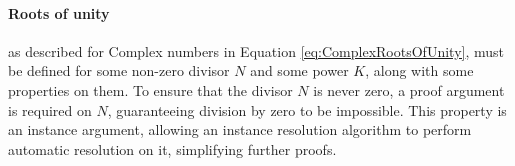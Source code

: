 \begin{AgdaMultiCode}
\paragraph{Roots of unity}\label{para:roots_of_unity} as described for Complex numbers in Equation 
\ref{eq:ComplexRootsOfUnity}, must be defined for some non-zero divisor $N$ 
and some power $K$, along with some properties on them.
To ensure that the divisor $N$ is never zero, a  proof argument is 
required on $N$, guaranteeing division by zero to be impossible.
This  property is an instance argument, allowing an instance 
resolution algorithm\cite{InstanceArgs}
to perform automatic resolution on it, simplifying further proofs.
\begin{code}%
%
\>[6]\AgdaSpace{}%
\AgdaSymbol{:}\AgdaSpace{}%
\AgdaSymbol{(}\AgdaSpace{}%
\AgdaSymbol{:}\AgdaSpace{}%
\AgdaSymbol{)}\AgdaSpace{}%
\AgdaSpace{}%
\AgdaSpace{}%
\AgdaSpace{}%
\AgdaSymbol{:}\AgdaSpace{}%
\AgdaSpace{}%
\AgdaSpace{}%
\AgdaSymbol{\}\}}\AgdaSpace{}%
\AgdaSpace{}%
\AgdaSymbol{(}\AgdaSpace{}%
\AgdaSymbol{:}\AgdaSpace{}%
\AgdaSymbol{)}\AgdaSpace{}%
\AgdaSpace{}%
\<%
\\
%
\>[6]%
\>[17]\AgdaSymbol{:}\AgdaSpace{}%
\AgdaSpace{}%
\AgdaSpace{}%
%
\>[43]\AgdaSpace{}%
\<%
\\
%
\>[6]%
\>[17]\AgdaSymbol{:}\AgdaSpace{}%
\AgdaSpace{}%
\AgdaSpace{}%
\AgdaSymbol{(}\AgdaSpace{}%
\AgdaSpace{}%
\AgdaSymbol{)}%
\>[43]\AgdaSpace{}%
\<%
\\
%
\>[6]%
\>[17]\AgdaSymbol{:}\AgdaSpace{}%
\AgdaSpace{}%
\AgdaSymbol{(}\AgdaSpace{}%
\AgdaSpace{}%
\AgdaSymbol{)}\AgdaSpace{}%
\AgdaSymbol{(}\AgdaSpace{}%
\AgdaSpace{}%
\AgdaSymbol{)}%
\>[43]\AgdaSpace{}%
\AgdaSpace{}%
\AgdaSpace{}%
\<%
\\
%
\>[6]%
\>[17]\AgdaSymbol{:}\AgdaSpace{}%
\AgdaSpace{}%
\AgdaSpace{}%
\AgdaSymbol{(}\AgdaSpace{}%
\AgdaSpace{}%
\AgdaSymbol{)}%
\>[43]\AgdaSpace{}%
\AgdaSymbol{(}\AgdaSpace{}%
\AgdaSpace{}%
\AgdaSymbol{)}\AgdaSpace{}%
\AgdaOperator{\AgdaField{*}}\AgdaSpace{}%
\AgdaSymbol{(}\AgdaSpace{}%
\AgdaSpace{}%
\AgdaSymbol{)}\<%
\end{code}
\end{AgdaMultiCode}


